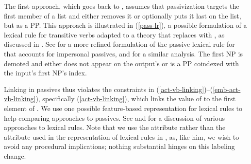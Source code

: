 \documentclass[output=paper,biblatex,babelshorthands,newtxmath,draftmode,colorlinks, citecolor=brown]{langscibook}
\begin{document}
The first approach, which goes back to \citet[]{pollard+sag:1987}, assumes that
passivization targets the first member of a  list and either removes it or optionally
puts it last on the list, but as a PP.  This approach is illustrated in (\ref{pass-lr}), a possible
formulation of a lexical rule for transitive verbs adapted to a theory that replaces 
with \argst, as discussed in \citet[67]{Manning+Sag:1999}.  See  for a more
refined formulation of the passive lexical rule for  that accounts for impersonal
passives, and \citet{Blevins2003} for a similar analysis.  The first NP is demoted and either does
not appear on the output's \argst or is a PP coindexed with the input's first NP's index.

\largerpage
Linking in passives thus violates the constraints in
(\ref{act-vb-linking})--(\ref{emb-act-vb-linking}), specifically (\ref{act-vb-linking}), which links
the value of  to the first element of \argst. We use one possible feature-based
representation for lexical rules to help comparing approaches to passives. See \citet{Meurers2001}
and  for a discussion of various approaches to lexical rules.  Note that
we use the attribute  rather than the  attribute used in the
representation of lexical rules in \citet[76]{Meurers2001}, as, like him, we wish to avoid any
procedural implications; nothing substantial hinges on this labeling change.
\end{document}
